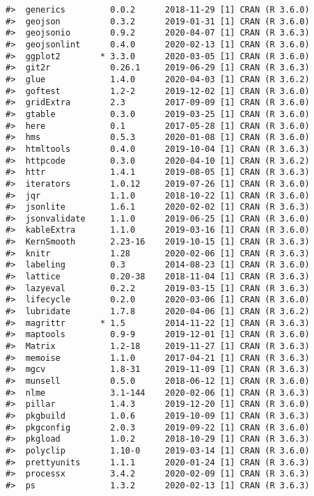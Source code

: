\documentclass[
]{sa}
\begin{document}
\begin{verbatim}
#>  generics         0.0.2      2018-11-29 [1] CRAN (R 3.6.0)
#>  geojson          0.3.2      2019-01-31 [1] CRAN (R 3.6.0)
#>  geojsonio        0.9.2      2020-04-07 [1] CRAN (R 3.6.3)
#>  geojsonlint      0.4.0      2020-02-13 [1] CRAN (R 3.6.0)
#>  ggplot2        * 3.3.0      2020-03-05 [1] CRAN (R 3.6.0)
#>  git2r            0.26.1     2019-06-29 [1] CRAN (R 3.6.3)
#>  glue             1.4.0      2020-04-03 [1] CRAN (R 3.6.2)
#>  goftest          1.2-2      2019-12-02 [1] CRAN (R 3.6.0)
#>  gridExtra        2.3        2017-09-09 [1] CRAN (R 3.6.0)
#>  gtable           0.3.0      2019-03-25 [1] CRAN (R 3.6.0)
#>  here             0.1        2017-05-28 [1] CRAN (R 3.6.0)
#>  hms              0.5.3      2020-01-08 [1] CRAN (R 3.6.0)
#>  htmltools        0.4.0      2019-10-04 [1] CRAN (R 3.6.3)
#>  httpcode         0.3.0      2020-04-10 [1] CRAN (R 3.6.2)
#>  httr             1.4.1      2019-08-05 [1] CRAN (R 3.6.3)
#>  iterators        1.0.12     2019-07-26 [1] CRAN (R 3.6.0)
#>  jqr              1.1.0      2018-10-22 [1] CRAN (R 3.6.0)
#>  jsonlite         1.6.1      2020-02-02 [1] CRAN (R 3.6.3)
#>  jsonvalidate     1.1.0      2019-06-25 [1] CRAN (R 3.6.0)
#>  kableExtra       1.1.0      2019-03-16 [1] CRAN (R 3.6.0)
#>  KernSmooth       2.23-16    2019-10-15 [1] CRAN (R 3.6.3)
#>  knitr            1.28       2020-02-06 [1] CRAN (R 3.6.3)
#>  labeling         0.3        2014-08-23 [1] CRAN (R 3.6.0)
#>  lattice          0.20-38    2018-11-04 [1] CRAN (R 3.6.3)
#>  lazyeval         0.2.2      2019-03-15 [1] CRAN (R 3.6.3)
#>  lifecycle        0.2.0      2020-03-06 [1] CRAN (R 3.6.0)
#>  lubridate        1.7.8      2020-04-06 [1] CRAN (R 3.6.2)
#>  magrittr       * 1.5        2014-11-22 [1] CRAN (R 3.6.3)
#>  maptools         0.9-9      2019-12-01 [1] CRAN (R 3.6.0)
#>  Matrix           1.2-18     2019-11-27 [1] CRAN (R 3.6.3)
#>  memoise          1.1.0      2017-04-21 [1] CRAN (R 3.6.3)
#>  mgcv             1.8-31     2019-11-09 [1] CRAN (R 3.6.3)
#>  munsell          0.5.0      2018-06-12 [1] CRAN (R 3.6.0)
#>  nlme             3.1-144    2020-02-06 [1] CRAN (R 3.6.3)
#>  pillar           1.4.3      2019-12-20 [1] CRAN (R 3.6.0)
#>  pkgbuild         1.0.6      2019-10-09 [1] CRAN (R 3.6.3)
#>  pkgconfig        2.0.3      2019-09-22 [1] CRAN (R 3.6.0)
#>  pkgload          1.0.2      2018-10-29 [1] CRAN (R 3.6.3)
#>  polyclip         1.10-0     2019-03-14 [1] CRAN (R 3.6.0)
#>  prettyunits      1.1.1      2020-01-24 [1] CRAN (R 3.6.3)
#>  processx         3.4.2      2020-02-09 [1] CRAN (R 3.6.3)
#>  ps               1.3.2      2020-02-13 [1] CRAN (R 3.6.3)

\end{verbatim}
\end{document}
